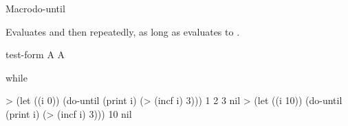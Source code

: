\documentclass[10pt,twoside,english,pdftex]{article}
\begin{document}
\begin{functiondoc}{Macro}{do-until}{} 
%
  
\fnsyntax

\fnpurpose Evaluates  and then 
repeatedly, as long as  evaluates to \nil.

\fnpackage {}

\fnmodule {}

\fnargs
\begin{args}{test-form}
\arg[form] A 
 A 
\end{args}

\begin{alsos}{while}
\also[until]
\also[while]
\end{alsos}

\fnexamples
\begin{example}
> (let ((i 0)) 
    (do-until (print i)
        (> (incf i) 3)))
1 
2 
3 
nil
> (let ((i 10)) 
    (do-until (print i)
        (> (incf i) 3)))
10
nil
\end{example}

\end{functiondoc}

\end{document}
